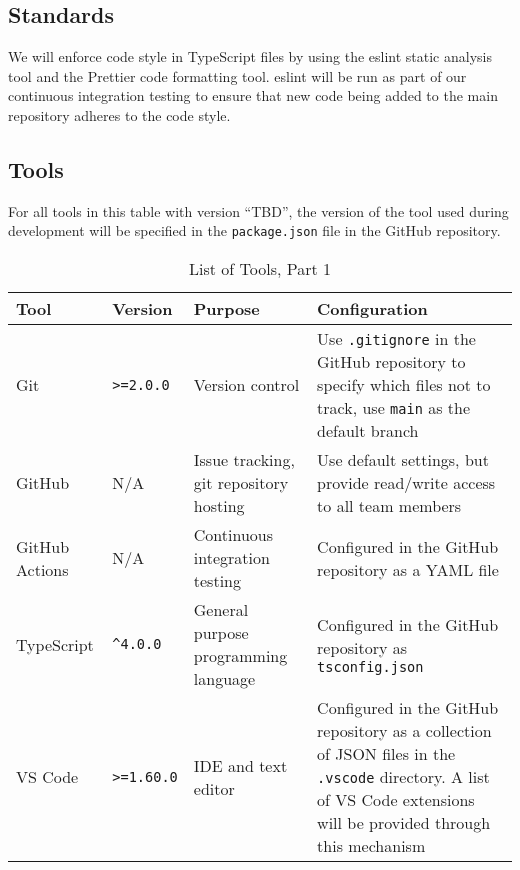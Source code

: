 \documentclass[fullpage]{article}
\begin{document}
\subsection{Standards}
We will enforce code style in TypeScript files by using the eslint static analysis tool and the Prettier code formatting tool. eslint will be run as part of our continuous integration testing to ensure that new code being added to the main repository adheres to the code style. 

\subsection{Tools}

For all tools in this table with version ``TBD'', the version of the tool used during development will be specified in the \verb|package.json| file in the GitHub repository.

\begin{table}[H]
\centering
\begin{tabular}{| l | l | p{3cm} | p{4cm} |}
\hline
 \rowcolor{lightgray} 
\textbf{Tool} & \textbf{Version} & \textbf{Purpose} & \textbf{Configuration} \\
\hline
Git & \verb|>=2.0.0| & Version control & Use \verb|.gitignore| in the GitHub repository to specify which files not to track, use \verb|main| as the default branch \\
\hline
GitHub & N/A & Issue tracking, git repository hosting & Use default settings, but provide read/write access to all team members \\
\hline
GitHub Actions & N/A & Continuous integration testing  & Configured in the GitHub repository as a YAML file  \\
\hline
TypeScript & \verb|^4.0.0| & General purpose programming language & Configured in the GitHub repository as \verb|tsconfig.json| \\
\hline
VS Code & \verb|>=1.60.0| & IDE and text editor & Configured in the GitHub repository as a collection of JSON files in the \verb|.vscode| directory. A list of VS Code extensions will be provided through this mechanism \\
\hline
\end{tabular}
\caption{List of Tools, Part 1}
\end{table}
\end{document}
